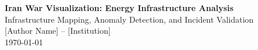 \documentclass[11pt]{article}
\begin{document}

\pagecolor{babyblue}

\begin{center}
{\Large\bfseries\color{headerblue} Iran War Visualization: Energy Infrastructure Analysis}\\[0.25cm]
{\large Infrastructure Mapping, Anomaly Detection, and Incident Validation}\\[0.3cm]
{\normalsize [Author Name] -- [Institution]}\\[0.15cm]
{\normalsize \today}
\end{center}

\vspace{0.15cm}

\vfill
\end{document}
